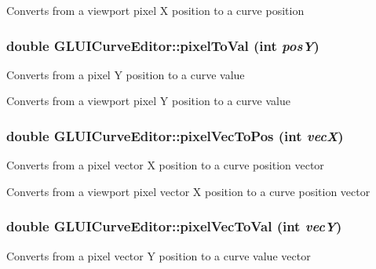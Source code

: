 Converts from a viewport pixel X position to a curve position \hypertarget{classCartWheel_1_1GL_1_1GLUICurveEditor_acfac3c216bba8b5d5a144a8c0e22ebf0}{
\subsubsection[{pixelToVal}]{\setlength{\rightskip}{0pt plus 5cm}double GLUICurveEditor::pixelToVal (int {\em posY})}}
\label{classCartWheel_1_1GL_1_1GLUICurveEditor_acfac3c216bba8b5d5a144a8c0e22ebf0}
Converts from a pixel Y position to a curve value

Converts from a viewport pixel Y position to a curve value \hypertarget{classCartWheel_1_1GL_1_1GLUICurveEditor_a4c31fd99c4d4d053a86092fe589dd5e3}{
\subsubsection[{pixelVecToPos}]{\setlength{\rightskip}{0pt plus 5cm}double GLUICurveEditor::pixelVecToPos (int {\em vecX})}}
\label{classCartWheel_1_1GL_1_1GLUICurveEditor_a4c31fd99c4d4d053a86092fe589dd5e3}
Converts from a pixel vector X position to a curve position vector

Converts from a viewport pixel vector X position to a curve position vector \hypertarget{classCartWheel_1_1GL_1_1GLUICurveEditor_a4e5c754e370061ac7a2fba6f4964c15b}{
\subsubsection[{pixelVecToVal}]{\setlength{\rightskip}{0pt plus 5cm}double GLUICurveEditor::pixelVecToVal (int {\em vecY})}}
\label{classCartWheel_1_1GL_1_1GLUICurveEditor_a4e5c754e370061ac7a2fba6f4964c15b}
Converts from a pixel vector Y position to a curve value vector

